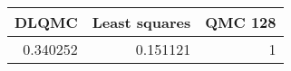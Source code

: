 \begin{tabular}{rrr}
\toprule
    DLQMC &   Least squares &   QMC 128 \\
\midrule
 0.340252 &        0.151121 &         1 \\
\bottomrule
\end{tabular}
